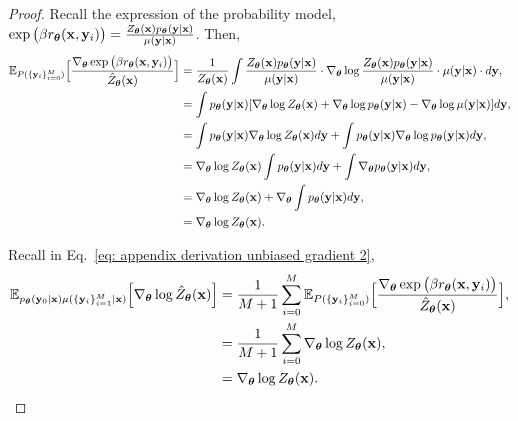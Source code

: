 \begin{proof}
Recall the expression of the probability model,
$
\exp\big(
\beta
r_{\boldsymbol\theta}(\mathbf{x}, \mathbf{y}_i)
\big)
=
\frac{Z_{\boldsymbol\theta}(\mathbf{x}) p_{\boldsymbol\theta}(\mathbf{y} | \mathbf{x})} {\mu(\mathbf{y} | \mathbf{x})}
$.
Then,
\begin{align*}
\label{eq: appendix derivation unbiased gradient 3}
\mathbb{E}_{P(\{\mathbf{y}_i \}_{i=0}^M)
}
\Big[
\frac{\nabla_{\boldsymbol\theta}\exp\big( 
\beta
r_{\boldsymbol\theta}(\mathbf{x}, \mathbf{y}_i)
\big)} 
{\hat{Z}_{\boldsymbol\theta}(\mathbf{x})
}
\Big]
& =
\frac{1}{Z_{\boldsymbol\theta}(\mathbf{x})}
\int
\frac{Z_{\boldsymbol\theta}(\mathbf{x}) p_{\boldsymbol\theta}(\mathbf{y} | \mathbf{x})} {\mu(\mathbf{y} | \mathbf{x})}
\cdot
\nabla_{\boldsymbol\theta}
\log 
\frac{Z_{\boldsymbol\theta}(\mathbf{x}) p_{\boldsymbol\theta}(\mathbf{y} | \mathbf{x})} {\mu(\mathbf{y} | \mathbf{x})}
\cdot
\mu(\mathbf{y} | \mathbf{x}) 
\cdot
d\mathbf{y},
\\ \nonumber
& =
\int
p_{\boldsymbol\theta}(\mathbf{y} | \mathbf{x})
[
\nabla_{\boldsymbol\theta} \log Z_{\boldsymbol\theta}(\mathbf{x})
+
\nabla_{\boldsymbol\theta} \log p_{\boldsymbol\theta}(\mathbf{y} | \mathbf{x}) 
-
\nabla_{\boldsymbol\theta} \log \mu(\mathbf{y} | \mathbf{x})
]
d\mathbf{y},
\\ \nonumber
& =
\int p_{\boldsymbol\theta}(\mathbf{y} | \mathbf{x})
\nabla_{\boldsymbol\theta} \log Z_{\boldsymbol\theta}(\mathbf{x})
d \mathbf{y}
+
\int p_{\boldsymbol\theta}(\mathbf{y} | \mathbf{x})
\nabla_{\boldsymbol\theta} \log p_{\boldsymbol\theta}(\mathbf{y} | \mathbf{x})
d \mathbf{y},
\\ \nonumber
& =
\nabla_{\boldsymbol\theta} \log Z_{\boldsymbol\theta}(\mathbf{x})
\int
p_{\boldsymbol\theta}(\mathbf{y} | \mathbf{x}) d\mathbf{y}
+
\int
\nabla_{\boldsymbol\theta}
p_{\boldsymbol\theta}(\mathbf{y} | \mathbf{x}) d\mathbf{y},
\\ \nonumber
& =
\nabla_{\boldsymbol\theta} \log Z_{\boldsymbol\theta}(\mathbf{x})
+
\nabla_{\boldsymbol\theta}
\int
p_{\boldsymbol\theta}(\mathbf{y} | \mathbf{x}) d\mathbf{y},
\\ \nonumber
& =
\nabla_{\boldsymbol\theta} \log Z_{\boldsymbol\theta}(\mathbf{x}).
\end{align*}

Recall in Eq.~\eqref{eq: appendix derivation unbiased gradient 2},
\begin{align*}
\mathbb{E}_{p_{\boldsymbol\theta}(\mathbf{y}_0 | \mathbf{x}) 
\mu(\{\mathbf{y}_i\}_{i=1}^M | \mathbf{x})
}
\Big[
\nabla_{\boldsymbol\theta} \log \hat{Z}_{\boldsymbol\theta}(\mathbf{x})
\Big]
& = 
\frac{1} {M + 1}
\sum_{i=0}^M
\mathbb{E}_{
P(\{\mathbf{y}_i \}_{i=0}^M)
}
\Big[
\frac{\nabla_{\boldsymbol\theta}\exp\big(
\beta
r_{\boldsymbol\theta}(\mathbf{x}, \mathbf{y}_i)
\big)
} 
{\hat{Z}_{\boldsymbol\theta}(\mathbf{x})}
\Big],
\\ \nonumber
& =
\frac{1}{M + 1}
\sum_{i=0}^M
\nabla_{\boldsymbol\theta} \log Z_{\boldsymbol\theta}(\mathbf{x}),
\\ \nonumber
& =
\nabla_{\boldsymbol\theta} \log Z_{\boldsymbol\theta}(\mathbf{x}).
\end{align*}
\end{proof}


